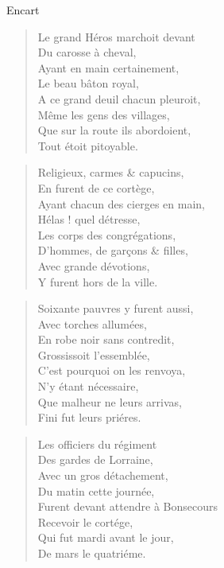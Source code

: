\begin{diary}{Encart}{}
        \begin{verse}Le grand Héros marchoit devant\\Du carosse à cheval,\\Ayant en main certainement,\\Le beau bâton royal,\\A ce grand deuil chacun pleuroit,\\Même les gens des villages,\\Que sur la route ils abordoient,\\Tout étoit pitoyable.\\\end{verse}
        \bigskip

        \begin{verse}Religieux, carmes \& capucins,\\En furent de ce cortège,\\Ayant chacun des cierges en main,\\Hélas ! quel détresse,\\Les corps des congrégations,\\D'hommes, de garçons \& filles,\\Avec grande dévotions,\\Y furent hors de la ville.\\\end{verse}
        \bigskip

        \begin{verse}Soixante pauvres y furent aussi,\\Avec torches allumées,\\En robe noir sans contredit,\\Grossissoit l'essemblée,\\C’est pourquoi on les renvoya,\\N'y étant nécessaire,\\Que malheur ne leurs arrivas,\\Fini fut leurs priéres.\\\end{verse}
        \bigskip

        \begin{verse}Les officiers du régiment\\Des gardes de Lorraine,\\Avec un gros détachement,\\Du matin cette journée,\\Furent devant attendre à Bonsecours\\Recevoir le cortége,\\Qui fut mardi avant le jour,\\De mars le quatriéme.\\\end{verse}
        \bigskip


\end{diary}
